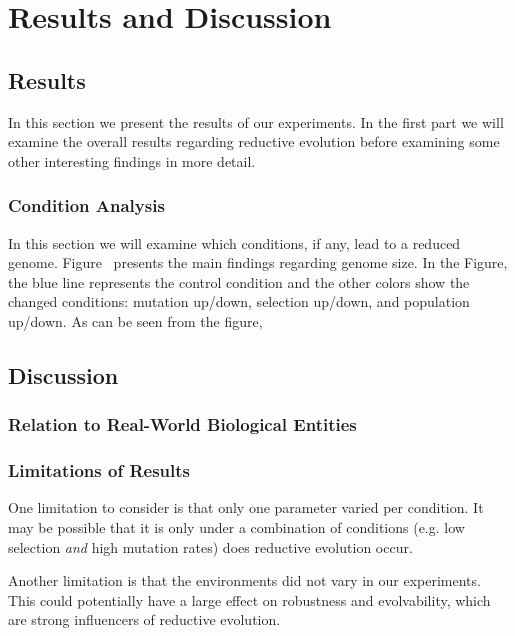 \chapter{Results and Discussion}\label{ch:results_discussion}


\section{Results}\label{results}
In this section we present the results of our experiments. In the first part we will examine the overall results regarding reductive evolution before examining some other interesting findings in more detail.

\subsection{Condition Analysis}
In this section we will examine which conditions, if any, lead to a reduced genome. Figure~%
presents the main findings regarding genome size. In the Figure, the blue line %
represents the control condition and the other colors show the changed conditions: mutation up/down, selection up/down, and population up/down. As can be seen from the figure, 





\section{Discussion}\label{discussion}

\subsection{Relation to Real-World Biological Entities}

\subsection{Limitations of Results}\label{limitations}
One limitation to consider is that only one parameter varied per condition. It may be possible that it is only under a combination of conditions (e.g. low selection \textit{and} high mutation rates) does reductive evolution occur. 

Another limitation is that the environments did not vary in our experiments. This could potentially have a large effect on robustness and evolvability, which are strong influencers of reductive evolution. 